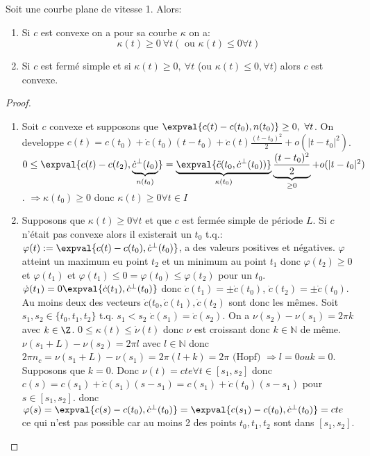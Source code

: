 		\begin{theorem}
			Soit une courbe plane de vitesse 1. Alors:
			\begin{enumerate}
				\item Si $c$ est convexe on a pour sa courbe $\kappa$ on a:
				$$\kappa(t)\geq 0\ \forall t (\mbox{ ou } \kappa(t)\leq 0 \forall t)$$
				\item Si $c$ est fermé simple et si $\kappa(t)\geq 0,\ \forall t $ (ou $\kappa(t)\leq 0, \forall t$) alors $c$ est convexe.
			\end{enumerate}
		\end{theorem}

		\begin{proof}
			\begin{enumerate}
				\item Soit $c$ convexe et supposons que $\expval{c(t)-c(t_0), n(t_0)}\geq 0,\ \forall t$. On developpe $c(t)=c(t_0)+\dot c(t_0)(t-t_0)+\ddot c(t)\frac{(t-t_0)^2}2 + o(|t-t_0|^2)$.
				$0\leq \expval{c(t)-c(t_2), \underbrace{\dot c^\perp(t_0)}_{n(t_0)} }=\underbrace{\expval{\ddot c(t_0, \dot c^\perp(t_0))} }_{\kappa(t_0)}\underbrace{\frac{(t-t_0)^2}2}_{\geq 0}+ o(|t-t_0|^2)$.
				$\Rightarrow \kappa(t_0)\geq 0$ donc $\kappa(t)\geq 0 \forall t\in I$
				\item Supposons que $\kappa(t)\geq 0\forall t$ et que $c$ est fermée simple de période $L$. Si $c$ n'était pas convexe alors il existerait un $t_0$ t.q.:
				$\varphi(t):=\expval{c(t)-c(t_0), \dot c^\perp(t_0)}$, a des valeurs positives et négatives.
				$\varphi$ atteint un maximum eu point $t_2$ et un minimum au point $t_1$ donc $\varphi(t_2)\geq 0$ et $\varphi(t_1)$ et $\varphi(t_1)\leq 0=\varphi(t_0)\leq\varphi(t_2)$ pour un $t_0$. $\dot \varphi (t_1)=0\expval{\dot c(t_1), \dot c^\perp(t_0)}$ donc $\dot c (t_1)=\pm \dot c(t_0)$, $\dot c(t_2)=\pm \dot c(t_0)$. Au moins deux des vecteurs $\dot c(t_0, \dot c (t_1), \dot c (t_2)$ sont donc les mêmes. Soit $s_1, s_2 \in \{t_0, t_1, t_2\}$ t.q. $s_1<s_2$ $\dot c(s_1)=\dot c(s_2)$. On a $\nu(s_2)-\nu(s_1)=2\pi k$ avec $k\in\Z$. $0\leq \kappa (t)\leq\dot\nu(t)$ donc $\nu$ est croissant donc $k\in\mathbb{N}$ de même. $\nu(s_1+L)-\nu(s_2)=2\pi l$ avec $l\in\mathbb{N}$ donc $2\pi n_c=\nu(s_1+L)-\nu(s_1)=2\pi (l+k)=2\pi \mbox{ (Hopf) } \Rightarrow l=0 ou k=0$. Supposons que $k=0$.
				Donc $\nu(t)=cte \forall t\in [s_1, s_2]$ donc $c(s)=c(s_1)+\dot c(s_1)(s-s_1)=c(s_1)+\dot c(t_0)(s-s_1)$ pour $s\in[s_1,s_2]$. donc $\varphi(s)=\expval{c(s)-c(t_0), \dot c^\perp(t_0)}=\expval{c(s_1)-c(t_0), \dot c^\perp(t_0)}=cte$ ce qui n'est pas possible car au moins 2 des points $t_0, t_1, t_2$ sont dans $[s_1, s_2]$.
			\end{enumerate}
		\end{proof}

